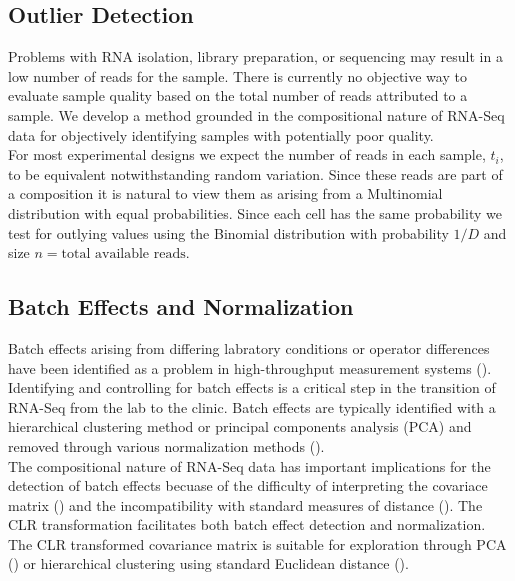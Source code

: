 \documentclass{article}\usepackage[]{graphicx}\usepackage[]{color}
\begin{document}
\subsection{Outlier Detection}
Problems with RNA isolation, library preparation, or sequencing may result in a low number of reads for the sample.  There is currently no objective way to evaluate sample quality based on the total number of reads attributed to a sample. We develop a method grounded in the compositional nature of RNA-Seq data for objectively identifying samples with potentially poor quality.\\

For most experimental designs we expect the number of reads in each sample, $t_i$, to be equivalent notwithstanding random variation.   Since these reads are part of a composition it is natural to view them as arising from a Multinomial distribution with equal probabilities. Since each cell has the same probability we test for outlying values using the Binomial distribution with probability $1/D$ and size $n = \text{total available reads}$.



\subsection{Batch Effects and Normalization}
Batch effects arising from differing labratory conditions or operator differences have been identified as a problem in high-throughput measurement systems (\cite{leek2010, chen2011}).  Identifying and controlling for batch effects is a critical step in the transition of RNA-Seq from the lab to the clinic.  Batch effects are typically identified with a hierarchical clustering method or principal components analysis (PCA) and removed through various normalization methods (\cite{Robinson2007, Anders2010, Robinson2010, Law2014, leek2014}).  \\ 

The compositional nature of RNA-Seq data has important implications for the detection of batch effects becuase of the difficulty of interpreting the covariace matrix (\cite{Aitchison1986}) and the incompatibility with standard measures of distance (\cite{Martin-Fernandez1998}).  The CLR transformation facilitates both batch effect detection and normalization.  The CLR transformed covariance matrix is suitable for exploration through PCA (\cite{Aitchison2002}) or hierarchical clustering using standard Euclidean distance (\cite{Martin-Fernandez1998}).  \\
\end{document}
